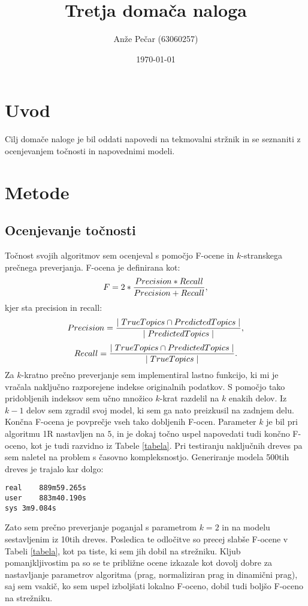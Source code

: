 \documentclass[a4paper,11pt]{article}
\title{Tretja domača naloga}
\author{Anže Pečar (63060257)}
\date{\today}
\begin{document}
\maketitle

\section{Uvod}

Cilj domače naloge je bil oddati napovedi na tekmovalni stržnik in se seznaniti z ocenjevanjem točnosti in napovednimi modeli.

\section{Metode}
\subsection{Ocenjevanje točnosti}
Točnost svojih algoritmov sem ocenjeval s pomočjo F-ocene in $k$-stranskega prečnega preverjanja. F-ocena je definirana kot:
\[F = 2 * {Precision*Recall\over{Precision + Recall}},\]
kjer sta precision in recall:
\[ Precision = {\mid TrueTopics  \cap  PredictedTopics \mid \over{\mid PredictedTopics \mid}}, \]
\[ Recall = {\mid TrueTopics  \cap  PredictedTopics \mid \over{\mid TrueTopics \mid}}. \]
Za $k$-kratno prečno preverjanje sem implementiral lastno funkcijo, ki mi je vračala naključno razporejene indekse originalnih podatkov. S pomočjo tako pridobljenih indeksov sem učno množico $k$-krat razdelil na $k$ enakih delov.  Iz $k - 1$ delov sem zgradil svoj model, ki sem ga nato preizkusil na zadnjem delu. Končna F-ocena je povprečje vseh tako dobljenih F-ocen. Parameter $k$ je bil pri algoritmu 1R nastavljen na $5$, in je dokaj točno uspel napovedati tudi končno F-oceno, kot je tudi razvidno iz Tabele \ref{tabela}. Pri testiranju naključnih dreves pa sem naletel na problem s časovno kompleksnostjo. Generiranje modela 500tih dreves je trajalo kar dolgo:
\begin{verbatim}
real	889m59.265s
user	883m40.190s
sys	3m9.084s
\end{verbatim}
Zato sem prečno preverjanje poganjal s parametrom $k = 2$ in na modelu sestavljenim iz 10tih dreves. Posledica te odločitve so precej slabše F-ocene v Tabeli \ref{tabela}, kot pa tiste, ki sem jih dobil na strežniku. Kljub pomanjkljivostim pa so se te približne ocene izkazale kot dovolj dobre za nastavljanje parametrov algoritma (prag, normaliziran prag in dinamični prag), saj sem vsakič, ko sem uspel izboljšati lokalno F-oceno, dobil tudi boljšo F-oceno na strežniku. 
\end{document}

